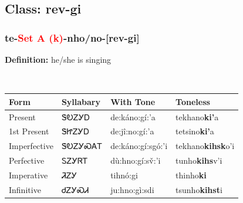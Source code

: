 \subsection*{Class: rev-gi}
\nopagebreak
\needspace{2in}
\subsubsection*{te{-}\textcolor{Red}{Set A (k)}{-}\textbf{nho/no}{-}[rev-gi]}
\nopagebreak
\textbf{Definition: } he/she is singing
\\[0.5em]
\begin{tabularx}{\textwidth}{l X X X}%
\toprule%
\textbf{Form}&\textbf{Syllabary}&\textbf{With Tone}&\textbf{Toneless}\\%
\midrule%
Present&ᏕᎧᏃᎩᎠ&de:káno:gí:’a&tekhano\textbf{ki'}a\\%
1st Present&ᏕᏥᏃᎩᎠ&de:jî:no:gí:’a&tetsino\textbf{ki'}a\\%
Imperfective&ᏕᎧᏃᎩᏍᎪᎢ&de:káno:gí:sgó:’i&tekhano\textbf{kihsk}o'i\\%
Perfective&ᏚᏃᎩᏒᎢ&dù:hno:gí:sv̌:’i&tunho\textbf{kihs}v'i\\%
Imperative&ᏘᏃᎩ&tihnó:gi&thinho\textbf{ki}\\%
Infinitive&ᏧᏃᎩᏍᏗ&ju:hno:gì:sdi&tsunho\textbf{kihst}i\\%
\bottomrule%
\end{tabularx}
\\[1em]